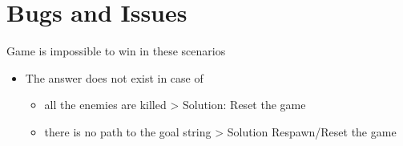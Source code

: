 \documentclass{article}
\begin{document}
\newpage

\section{Bugs and Issues}
Game is impossible to win in these scenarios
\begin{itemize}
    \item The answer does not exist in case of
    \begin{itemize}
        \item all the enemies are killed > Solution: Reset the game
        \item there is no path to the goal string > Solution Respawn/Reset the game
    \end{itemize}
\end{itemize}
\end{document}
